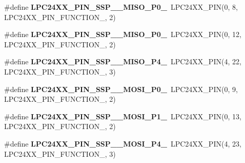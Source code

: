 \begin{DoxyCompactItemize}
\item 
\mbox{\label{group__lpc24xx__io_ga8c8bf43f8e253716d98ef47ef577a6ee}} 
\#define {\bfseries L\+P\+C24\+X\+X\+\_\+\+P\+I\+N\+\_\+\+S\+S\+P\+\_\+\_\+\+M\+I\+S\+O\+\_\+\+P0\+\_}~L\+P\+C24\+X\+X\+\_\+\+P\+IN(0, 8, L\+P\+C24\+X\+X\+\_\+\+P\+I\+N\+\_\+\+F\+U\+N\+C\+T\+I\+O\+N\+\_, 2)
\item 
\mbox{\label{group__lpc24xx__io_ga8c5c725bd33651823a71c18358ab7bee}} 
\#define {\bfseries L\+P\+C24\+X\+X\+\_\+\+P\+I\+N\+\_\+\+S\+S\+P\+\_\+\_\+\+M\+I\+S\+O\+\_\+\+P0\+\_}~L\+P\+C24\+X\+X\+\_\+\+P\+IN(0, 12, L\+P\+C24\+X\+X\+\_\+\+P\+I\+N\+\_\+\+F\+U\+N\+C\+T\+I\+O\+N\+\_, 2)
\item 
\mbox{\label{group__lpc24xx__io_ga6f2a47bab42cf15d59e7b96f14758cbb}} 
\#define {\bfseries L\+P\+C24\+X\+X\+\_\+\+P\+I\+N\+\_\+\+S\+S\+P\+\_\+\_\+\+M\+I\+S\+O\+\_\+\+P4\+\_}~L\+P\+C24\+X\+X\+\_\+\+P\+IN(4, 22, L\+P\+C24\+X\+X\+\_\+\+P\+I\+N\+\_\+\+F\+U\+N\+C\+T\+I\+O\+N\+\_, 3)
\item 
\mbox{\label{group__lpc24xx__io_gaa55025660f0960329d15b9b585cfbe8a}} 
\#define {\bfseries L\+P\+C24\+X\+X\+\_\+\+P\+I\+N\+\_\+\+S\+S\+P\+\_\+\_\+\+M\+O\+S\+I\+\_\+\+P0\+\_}~L\+P\+C24\+X\+X\+\_\+\+P\+IN(0, 9, L\+P\+C24\+X\+X\+\_\+\+P\+I\+N\+\_\+\+F\+U\+N\+C\+T\+I\+O\+N\+\_, 2)
\item 
\mbox{\label{group__lpc24xx__io_ga04777d5b23a67b12a03f7f932c9f3241}} 
\#define {\bfseries L\+P\+C24\+X\+X\+\_\+\+P\+I\+N\+\_\+\+S\+S\+P\+\_\+\_\+\+M\+O\+S\+I\+\_\+\+P1\+\_}~L\+P\+C24\+X\+X\+\_\+\+P\+IN(0, 13, L\+P\+C24\+X\+X\+\_\+\+P\+I\+N\+\_\+\+F\+U\+N\+C\+T\+I\+O\+N\+\_, 2)
\item 
\mbox{\label{group__lpc24xx__io_ga55f14f49da120be78cc9db3066b146d2}} 
\#define {\bfseries L\+P\+C24\+X\+X\+\_\+\+P\+I\+N\+\_\+\+S\+S\+P\+\_\+\_\+\+M\+O\+S\+I\+\_\+\+P4\+\_}~L\+P\+C24\+X\+X\+\_\+\+P\+IN(4, 23, L\+P\+C24\+X\+X\+\_\+\+P\+I\+N\+\_\+\+F\+U\+N\+C\+T\+I\+O\+N\+\_, 3)
\end{DoxyCompactItemize}
